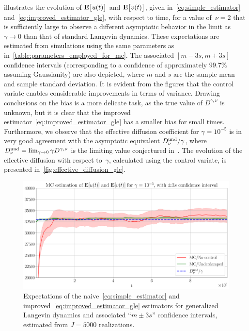 \documentclass[11pt,a4paper]{article}
\begin{document}
 illustrates the evolution of $\mathbf{E} \bigl[ u(t) \bigr]$ and $\mathbf{E} \bigl[ v(t) \bigr]$,
given in~\eqref{eq:simple_estimator} and~\eqref{eq:improved_estimator_gle},
with respect to time,
for a value of~$\nu = 2$ that is sufficiently large to observe a different asymptotic behavior in the limit as $\gamma \to 0$ than that of standard Langevin dynamics.
These expectations are estimated from simulations using the same parameters as in~\cref{table:parameters_employed_for_mc}.
The associated $[m - 3 s, m + 3 s]$ confidence intervals (corresponding to a confidence of approximately $99.7\%$ assuming Gaussianity) are also depicted,
where $m$ and $s$ are the sample mean and sample standard deviation.
It is evident from the figures that the control variate enables considerable improvements in terms of variance.
Drawing conclusions on the bias is a more delicate task,
as the true value of $D^{\gamma, \nu}$ is unknown,
but it is clear that the improved estimator~\eqref{eq:improved_estimator_gle} has a smaller bias for small times.
Furthermore, we observe that the effective diffusion coefficient for $\gamma = 10^{-5}$
is in very good agreement with the asymptotic equivalent $D^{\rm und}_{\nu}/\gamma$,
where $D^{\rm und}_{\nu} = \lim_{\gamma \to 0} \gamma D^{\gamma, \nu}$ is the limiting value conjectured in~\cite{GPGSUV21}.
The evolution of the effective diffusion with respect to~$\gamma$,
calculated using the control variate, is presented in~\cref{fig:effective_diffusion_gle}.
\begin{figure}[ht]
    \centering
    \includegraphics[width=0.8\linewidth]{figures/time-gle-5.pdf}
    \caption{%
        Expectations of the naive~\eqref{eq:simple_estimator} and improved~\eqref{eq:improved_estimator_gle} estimators for generalized Langevin dynamics
        and associated ``$m \pm 3 s$'' confidence intervals,
        estimated from $J = 5000$ realizations.
    }
    \label{fig:effective_diffusion_time_gle}
\end{figure}
\end{document}

